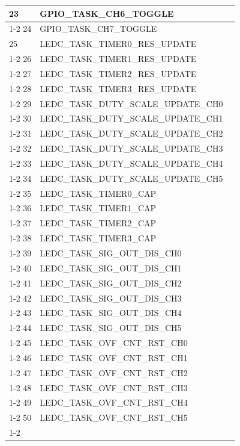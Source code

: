 \documentclass[main\_\_EN.tex]{subfiles}
\begin{document}
\begin{longtable}{ | l | l | l | }
23  & GPIO\_TASK\_CH6\_TOGGLE  &  \\ \cline{1-2}
24  & GPIO\_TASK\_CH7\_TOGGLE  &  \\ \hline
25  & LEDC\_TASK\_TIMER0\_RES\_UPDATE      & \nameref{mod:ledpwm} \\ \cline{1-2}
26  & LEDC\_TASK\_TIMER1\_RES\_UPDATE      & \\ \cline{1-2}
27  & LEDC\_TASK\_TIMER2\_RES\_UPDATE      & \\ \cline{1-2}
28  & LEDC\_TASK\_TIMER3\_RES\_UPDATE      & \\ \cline{1-2}
29  & LEDC\_TASK\_DUTY\_SCALE\_UPDATE\_CH0 & \\ \cline{1-2}
30  & LEDC\_TASK\_DUTY\_SCALE\_UPDATE\_CH1 & \\ \cline{1-2}
31  & LEDC\_TASK\_DUTY\_SCALE\_UPDATE\_CH2 & \\ \cline{1-2}
32  & LEDC\_TASK\_DUTY\_SCALE\_UPDATE\_CH3 & \\ \cline{1-2}
33  & LEDC\_TASK\_DUTY\_SCALE\_UPDATE\_CH4 & \\ \cline{1-2}
34  & LEDC\_TASK\_DUTY\_SCALE\_UPDATE\_CH5 & \\ \cline{1-2}
35  & LEDC\_TASK\_TIMER0\_CAP  & \\ \cline{1-2}
36  & LEDC\_TASK\_TIMER1\_CAP  & \\ \cline{1-2}
37  & LEDC\_TASK\_TIMER2\_CAP  & \\ \cline{1-2}
38  & LEDC\_TASK\_TIMER3\_CAP  & \\ \cline{1-2}
39  & LEDC\_TASK\_SIG\_OUT\_DIS\_CH0& \\ \cline{1-2}
40  & LEDC\_TASK\_SIG\_OUT\_DIS\_CH1& \\ \cline{1-2}
41  & LEDC\_TASK\_SIG\_OUT\_DIS\_CH2& \\ \cline{1-2}
42  & LEDC\_TASK\_SIG\_OUT\_DIS\_CH3& \\ \cline{1-2}
43  & LEDC\_TASK\_SIG\_OUT\_DIS\_CH4& \\ \cline{1-2}
44  & LEDC\_TASK\_SIG\_OUT\_DIS\_CH5& \\ \cline{1-2}
45  & LEDC\_TASK\_OVF\_CNT\_RST\_CH0& \\ \cline{1-2}
46  & LEDC\_TASK\_OVF\_CNT\_RST\_CH1& \\ \cline{1-2}
47  & LEDC\_TASK\_OVF\_CNT\_RST\_CH2& \\ \cline{1-2}
48  & LEDC\_TASK\_OVF\_CNT\_RST\_CH3& \\ \cline{1-2}
49  & LEDC\_TASK\_OVF\_CNT\_RST\_CH4& \\ \cline{1-2}
50  & LEDC\_TASK\_OVF\_CNT\_RST\_CH5& \\ \cline{1-2}

\end{longtable}
\end{document}

